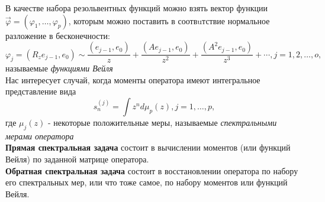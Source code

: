 В качестве набора резольвентных функций можно взять вектор функции
$\overrightarrow{\varphi}=(\varphi_1,\ldots,\varphi_p)$, которым
можно поставить в соотвuтствие нормальное разложение в
бесконечности:
\begin{equation} \label{WeylFuncs}
\varphi_j=(R_ze_{j-1},e_0)
\sim\frac{(e_{j-1},e_0)}{z}+\frac{(Ae_{j-1},e_0)}{z^2}+\frac{(A^2e_{j-1},e_0)}{z^3}+\cdots,\mbox{
}j=1,2,\ldots,o,
\end{equation}
называемые \emph{функциями Вейля} \\
Нас интересует случай, когда моменты оператора имеют интегральное
представление вида
\begin{equation}
s_n^{(j)}=\int z^n d\mu_p(z), j=1,\ldots,p,
\end{equation}
где $\mu_j(z)$ - некоторые положительные меры, называемые \emph{спектральными мерами оператора} \\
\textbf{Прямая спектральная задача} состоит в вычислении
моментов (или функций Вейля) по заданной матрице оператора. \\
\textbf{Обратная спектральная задача} состоит в восстановлении
оператора по набору его спектральных мер, или что тоже самое, по
набору моментов или функций Вейля. \\